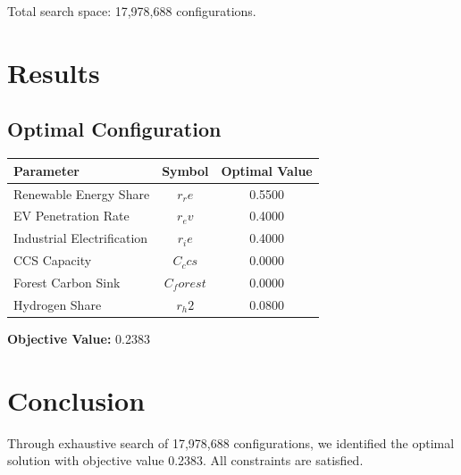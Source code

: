 \documentclass[11pt,a4paper]{article}
\begin{document}
Total search space: 17,978,688 configurations.

\section{Results}

\subsection{Optimal Configuration}

\begin{center}
\begin{tabular}{|l|c|c|}
\hline
Parameter & Symbol & Optimal Value \\
\hline
Renewable Energy Share & $r_re$ & 0.5500 \\
EV Penetration Rate & $r_ev$ & 0.4000 \\
Industrial Electrification & $r_ie$ & 0.4000 \\
CCS Capacity & $C_ccs$ & 0.0000 \\
Forest Carbon Sink & $C_forest$ & 0.0000 \\
Hydrogen Share & $r_h2$ & 0.0800 \\
\hline
\end{tabular}
\end{center}

\textbf{Objective Value:} 0.2383

\section{Conclusion}

Through exhaustive search of 17,978,688 configurations, we identified the optimal solution with objective value 0.2383. All constraints are satisfied.
\end{document}
